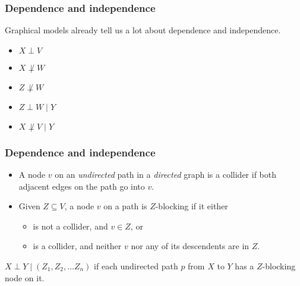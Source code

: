 \documentclass{beamer}
\begin{document}
\begin{frame}
    \frametitle{Dependence and independence}
    \begin{center}
    \end{center}
    Graphical models already tell us a lot about dependence and
    independence.\pause
    \begin{itemize}
        \item $X \perp V$
        \item $X \not\perp W$\pause
        \item $Z \not\perp W$\pause
        \item $Z \perp W \mid Y$\pause
        \item $X \not \perp V \mid Y$
    \end{itemize}
\end{frame}

\begin{frame}
    \frametitle{Dependence and independence}
    \begin{itemize}
        \item A node $v$ on an \emph{undirected} path in a \emph{directed} graph is
            a \alert{collider} if both adjacent edges on the path go into $v$.
        \item Given $Z \subseteq V$, a node $v$ on a path is
            \alert{$Z$-blocking} if it
            either
            \begin{itemize}
                \item is not a collider, and $v \in Z$, or
                \item is a collider, and neither $v$ nor any of its descendents
                    are in $Z$.
            \end{itemize}
    \end{itemize}
    \begin{theorem}
        $X \perp Y \mid (Z_1, Z_2, \ldots Z_n)$ if each undirected path $p$
        from $X$ to $Y$ has a $Z$-blocking node on it.
    \end{theorem}
\end{frame}
\end{document}
